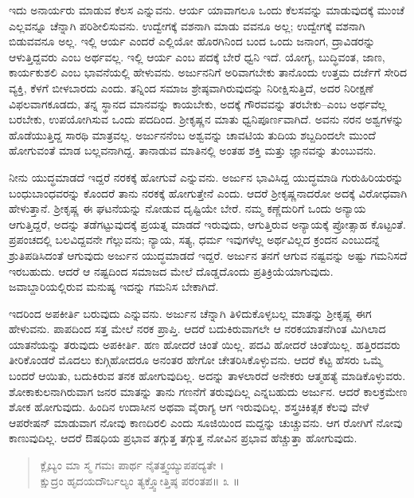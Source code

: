 ಇದು ಅನಾರ್ಯರು ಮಾಡುವ ಕೆಲಸ ಎನ್ನುವನು. ಆರ್ಯ ಯಾವಾಗಲೂ ಒಂದು ಕೆಲಸವನ್ನು ಮಾಡುವುದಕ್ಕೆ ಮುಂಚೆ ಎಲ್ಲವನ್ನೂ ಚೆನ್ನಾಗಿ ಪರಿಶೀಲಿಸುವನು. ಉದ್ವೇಗಕ್ಕೆ ವಶನಾಗಿ ಮಾಡು ವವನೂ ಅಲ್ಲ; ಉದ್ವೇಗಕ್ಕೆ ವಶನಾಗಿ ಬಿಡುವವನೂ ಅಲ್ಲ. ಇಲ್ಲಿ ಆರ್ಯ ಎಂದರೆ ಎಲ್ಲಿಯೋ ಹೊರಗಿನಿಂದ ಬಂದ ಒಂದು ಜನಾಂಗ, ದ್ರಾವಿಡರನ್ನು ಆಳುತ್ತಿದ್ದವರು ಎಂಬ ಅರ್ಥವಲ್ಲ. ಇಲ್ಲಿ ಆರ್ಯ ಎಂಬ ಪದಕ್ಕೆ ಬೇರೆ ಧ್ವನಿ ಇದೆ. ಯೋಗ್ಯ, ಬುದ್ಧಿವಂತ, ಜಾಣ, ಕಾರ್ಯಕುಶಲಿ ಎಂಬ ಭಾವನೆಯಲ್ಲಿ ಹೇಳುವನು. ಅರ್ಜುನನಿಗೆ ಅರಿವಾಗಬೇಕು ತಾನೊಂದು ಉತ್ತಮ ದರ್ಜೆಗೆ ಸೇರಿದ ವ್ಯಕ್ತಿ, ಕೆಳಗೆ ಬೀಳಬಾರದು ಎಂದು. ತನ್ನಿಂದ ಸಮಾಜ ಶ್ರೇಷ್ಠವಾಗಿರುವುದನ್ನು ನಿರೀಕ್ಷಿಸುತ್ತಿದೆ, ಅದರ ನಿರೀಕ್ಷಣೆ ವಿಫಲವಾಗಕೂಡದು, ತನ್ನ ಸ್ಥಾನದ ಮಾನವನ್ನು ಕಾಯಬೇಕು, ಅದಕ್ಕೆ ಗೌರವವನ್ನು ತರಬೇಕು–ಎಂಬ ಅರ್ಥವೆಲ್ಲ ಬರಬೇಕು, ಉಪಯೋಗಿಸುವ ಒಂದು ಪದದಿಂದ. ಶ್ರೀಕೃಷ್ಣನ ಮಾತು ಧ್ವನಿಪೂರ್ಣವಾಗಿದೆ. ಅವನು ನರನ ಅಶ್ವಗಳನ್ನು ಹೊಡೆಯುತ್ತಿದ್ದ ಸಾರಥಿ ಮಾತ್ರವಲ್ಲ. ಅರ್ಜುನನೆಂಬ ಅಶ್ವವನ್ನು ಚಾವಟಿಯ ತುದಿಯ ಶಬ್ದದಿಂದಲೇ ಮುಂದೆ ಹೋಗುವಂತೆ ಮಾಡ ಬಲ್ಲವನಾಗಿದ್ದ. ತಾನಾಡುವ ಮಾತಿನಲ್ಲಿ ಅಂತಹ ಶಕ್ತಿ ಮತ್ತು ಜ್ಞಾನವನ್ನು ತುಂಬುವನು.

ನೀನು ಯುದ್ಧಮಾಡದೆ ಇದ್ದರೆ ನರಕಕ್ಕೆ ಹೋಗುವೆ ಎನ್ನುವನು. ಅರ್ಜುನ ಭಾವಿಸಿದ್ದ ಯುದ್ಧಮಾಡಿ ಗುರುಹಿರಿಯರನ್ನು ಬಂಧುಬಾಂಧವರನ್ನು ಕೊಂದರೆ ತಾನು ನರಕಕ್ಕೆ ಹೋಗುತ್ತೇನೆ ಎಂದು. ಆದರೆ ಶ್ರೀಕೃಷ್ಣನಾದರೋ ಅದಕ್ಕೆ ವಿರೋಧವಾಗಿ ಹೇಳುತ್ತಾನೆ. ಶ್ರೀಕೃಷ್ಣ ಈ ಘಟನೆಯನ್ನು ನೋಡುವ ದೃಷ್ಟಿಯೇ ಬೇರೆ. ನಮ್ಮ ಕಣ್ಣೆದುರಿಗೆ ಒಂದು ಅನ್ಯಾಯ ಆಗುತ್ತಿದ್ದರೆ, ಅದನ್ನು ತಡೆಗಟ್ಟುವುದಕ್ಕೆ ಪ್ರಯತ್ನ ಮಾಡದೆ ಇರುವುದು, ಆಗುತ್ತಿರುವ ಅನ್ಯಾಯಕ್ಕೆ ಪ್ರೋತ್ಸಾಹ ಕೊಟ್ಟಂತೆ. ಪ್ರಪಂಚದಲ್ಲಿ ಬಲವಿದ್ದವನೇ ಗೆಲ್ಲುವನು; ನ್ಯಾಯ, ಸತ್ಯ, ಧರ್ಮ ಇವುಗಳೆಲ್ಲ ಅರ್ಥವಿಲ್ಲದ ಕ್ರಂದನ ಎಂಬುದನ್ನೆ ಶ್ರುತಿಪಡಿಸಿದಂತೆ ಆಗುವುದು ಅರ್ಜುನ ಯುದ್ಧಮಾಡದೆ ಇದ್ದರೆ. ಅರ್ಜುನ ತನಗೆ ಆಗುವ ನಷ್ಟವನ್ನು ಅಷ್ಟು ಗಮನಿಸದೆ ಇರಬಹುದು. ಆದರೆ ಆ ನಷ್ಟದಿಂದ ಸಮಾಜದ ಮೇಲೆ ದೊಡ್ಡದೊಂದು ಪ್ರತಿಕ್ರಿಯೆಯಾಗುವುದು. ಜವಾಬ್ದಾರಿಯಲ್ಲಿರುವ ಮನುಷ್ಯ ಇದನ್ನು ಗಮನಿಸ ಬೇಕಾಗಿದೆ.

ಇದರಿಂದ ಅಪಕೀರ್ತಿ ಬರುವುದು ಎನ್ನುವನು. ಅರ್ಜುನ ಚೆನ್ನಾಗಿ ತಿಳಿದುಕೊಳ್ಳಬಲ್ಲ ಮಾತನ್ನು ಶ್ರೀಕೃಷ್ಣ ಈಗ ಹೇಳುವನು. ಪಾಪದಿಂದ ಸತ್ತ ಮೇಲೆ ನರಕ ಪ್ರಾಪ್ತಿ. ಆದರೆ ಬದುಕಿರುವಾಗಲೇ ಆ ನರಕಯಾತನೆಗಿಂತ ಮಿಗಿಲಾದ ಯಾತನೆಯನ್ನು ತರುವುದು ಅಪಕೀರ್ತಿ. ಹಣ ಹೋದರೆ ಚಿಂತೆ ಯಿಲ್ಲ. ಪದವಿ ಹೋದರೆ ಚಿಂತೆಯಿಲ್ಲ. ಹತ್ತಿರದವರು ತೀರಿಕೊಂಡರೆ ಮೊದಲು ಕುಗ್ಗಿಹೋದರೂ ಅನಂತರ ಹೇಗೋ ಚೇತರಿಸಿಕೊಳ್ಳುವನು. ಆದರೆ ಕೆಟ್ಟ ಹೆಸರು ಒಮ್ಮೆ ಬಂದರೆ ಆಯಿತು, ಬದುಕಿರುವ ತನಕ ಹೋಗುವುದಿಲ್ಲ. ಅದನ್ನು ತಾಳಲಾರದೆ ಅನೇಕರು ಆತ್ಮಹತ್ಯೆ ಮಾಡಿಕೊಳ್ಳುವರು. ಶೋಕಾಕುಲನಾಗಿರುವಾಗ ಜನರ ಮಾತನ್ನು ತಾನು ಗಣನೆಗೆ ತರುವುದಿಲ್ಲ ಎನ್ನಬಹುದು ಅರ್ಜುನ. ಆದರೆ ಕಾಲಕ್ರಮೇಣ ಶೋಕ ಹೋಗುವುದು. ಹಿಂದಿನ ಉದಾಸೀನ ಅಥವಾ ವೈರಾಗ್ಯ ಆಗ ಇರುವುದಿಲ್ಲ. ಶಸ್ತ್ರಚಿಕಿತ್ಸಕ ಕೆಲವು ವೇಳೆ ಆಪರೇಷನ್ ಮಾಡುವಾಗ ನೋವು ಕಾಣದಿರಲಿ ಎಂದು ಸೂಜಿಯಿಂದ ಮದ್ದನ್ನು ಚುಚ್ಚುವನು. ಆಗ ರೋಗಿಗೆ ನೋವು ಕಾಣುವುದಿಲ್ಲ. ಆದರೆ ಔಷಧಿಯ ಪ್ರಭಾವ ತಗ್ಗುತ್ತ ತಗ್ಗುತ್ತ ನೋವಿನ ಪ್ರಭಾವ ಹೆಚ್ಚುತ್ತಾ ಹೋಗುವುದು.

\begin{verse}
ಕ್ಲೈಬ್ಯಂ ಮಾ ಸ್ಮ ಗಮಃ ಪಾರ್ಥ ನೈತತ್ತ್ವಯ್ಯುಪಪದ್ಯತೇ ।\\ಕ್ಷುದ್ರಂ ಹೃದಯದೌರ್ಬಲ್ಯಂ ತ್ಯಕ್ತ್ವೋತ್ತಿಷ್ಠ ಪರಂತಪ\num{॥ ೩ ॥}
\end{verse}

